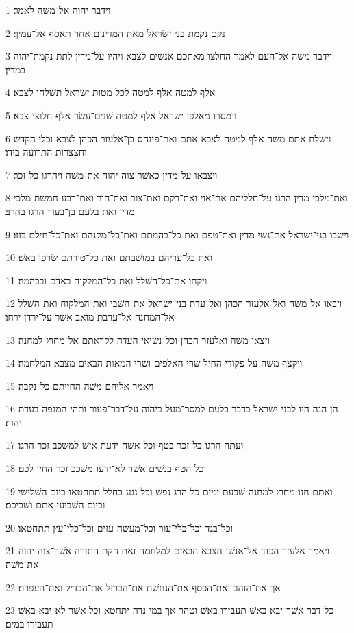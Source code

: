 \par 1 וידבר יהוה אל־משׁה לאמר׃
\par 2 נקם נקמת בני ישׂראל מאת המדינים אחר תאסף אל־עמיך׃
\par 3 וידבר משׁה אל־העם לאמר החלצו מאתכם אנשׁים לצבא ויהיו על־מדין לתת נקמת־יהוה במדין׃
\par 4 אלף למטה אלף למטה לכל מטות ישׂראל תשׁלחו לצבא׃
\par 5 וימסרו מאלפי ישׂראל אלף למטה שׁנים־עשׂר אלף חלוצי צבא׃
\par 6 וישׁלח אתם משׁה אלף למטה לצבא אתם ואת־פינחס בן־אלעזר הכהן לצבא וכלי הקדשׁ וחצצרות התרועה בידו׃
\par 7 ויצבאו על־מדין כאשׁר צוה יהוה את־משׁה ויהרגו כל־זכר׃
\par 8 ואת־מלכי מדין הרגו על־חלליהם את־אוי ואת־רקם ואת־צור ואת־חור ואת־רבע חמשׁת מלכי מדין ואת בלעם בן־בעור הרגו בחרב׃
\par 9 וישׁבו בני־ישׂראל את־נשׁי מדין ואת־טפם ואת כל־בהמתם ואת־כל־מקנהם ואת־כל־חילם בזזו׃
\par 10 ואת כל־עריהם במושׁבתם ואת כל־טירתם שׂרפו באשׁ׃
\par 11 ויקחו את־כל־השׁלל ואת כל־המלקוח באדם ובבהמה׃
\par 12 ויבאו אל־משׁה ואל־אלעזר הכהן ואל־עדת בני־ישׂראל את־השׁבי ואת־המלקוח ואת־השׁלל אל־המחנה אל־ערבת מואב אשׁר על־ירדן ירחו׃
\par 13 ויצאו משׁה ואלעזר הכהן וכל־נשׂיאי העדה לקראתם אל־מחוץ למחנה׃
\par 14 ויקצף משׁה על פקודי החיל שׂרי האלפים ושׂרי המאות הבאים מצבא המלחמה׃
\par 15 ויאמר אליהם משׁה החייתם כל־נקבה׃
\par 16 הן הנה היו לבני ישׂראל בדבר בלעם למסר־מעל ביהוה על־דבר־פעור ותהי המגפה בעדת יהוה׃
\par 17 ועתה הרגו כל־זכר בטף וכל־אשׁה ידעת אישׁ למשׁכב זכר הרגו׃
\par 18 וכל הטף בנשׁים אשׁר לא־ידעו משׁכב זכר החיו לכם׃
\par 19 ואתם חנו מחוץ למחנה שׁבעת ימים כל הרג נפשׁ וכל נגע בחלל תתחטאו ביום השׁלישׁי וביום השׁביעי אתם ושׁביכם׃
\par 20 וכל־בגד וכל־כלי־עור וכל־מעשׂה עזים וכל־כלי־עץ תתחטאו׃
\par 21 ויאמר אלעזר הכהן אל־אנשׁי הצבא הבאים למלחמה זאת חקת התורה אשׁר־צוה יהוה את־משׁה׃
\par 22 אך את־הזהב ואת־הכסף את־הנחשׁת את־הברזל את־הבדיל ואת־העפרת׃
\par 23 כל־דבר אשׁר־יבא באשׁ תעבירו באשׁ וטהר אך במי נדה יתחטא וכל אשׁר לא־יבא באשׁ תעבירו במים׃

